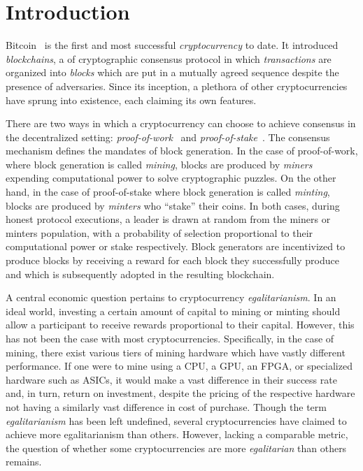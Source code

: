 
\section{Introduction}

Bitcoin~\cite{bitcoin} is the first and most successful \emph{cryptocurrency} to
date. It introduced \emph{blockchains}, a of cryptographic consensus protocol in
which \emph{transactions} are organized into \emph{blocks} which are put in a
mutually agreed sequence despite the presence of adversaries. Since its
inception, a plethora of other cryptocurrencies have sprung into existence, each
claiming its own features.

There are two ways in which a cryptocurrency can choose to achieve consensus in
the decentralized setting:
\emph{proof-of-work}~\cite{C:DwoNao92} and
\emph{proof-of-stake}~\cite{C:KRDO17}. The consensus mechanism defines the
mandates of block generation. In the case of proof-of-work, where block
generation is called \emph{mining}, blocks are produced by \emph{miners}
expending computational power to solve cryptographic puzzles. On the other hand,
in the case of proof-of-stake where block generation is called \emph{minting},
blocks are produced by \emph{minters} who ``stake'' their coins. In both cases,
during honest protocol executions, a leader is drawn at random from the
miners or minters population, with a probability of selection proportional to
their computational power or stake respectively. Block generators are
incentivized to produce blocks by receiving a reward for each block they
successfully produce and which is subsequently adopted in the resulting
blockchain.

A central economic question pertains to cryptocurrency \emph{egalitarianism}.
In an ideal world, investing a certain amount of capital to mining or minting
should allow a participant to receive rewards proportional to their capital.
However, this has not been the case with most cryptocurrencies. Specifically, in
the case of mining, there exist various tiers of mining hardware which have
vastly different performance. If one were to mine using a CPU, a GPU, an FPGA,
or specialized hardware such as ASICs, it would make a vast difference in their
success rate and, in turn, return on investment, despite the pricing of the
respective hardware not having a similarly vast difference in cost of purchase.
Though the term \emph{egalitarianism} has been left undefined, several
cryptocurrencies have claimed to achieve more egalitarianism than others.
However, lacking a comparable metric, the question of whether some
cryptocurrencies are more \emph{egalitarian} than others remains.

